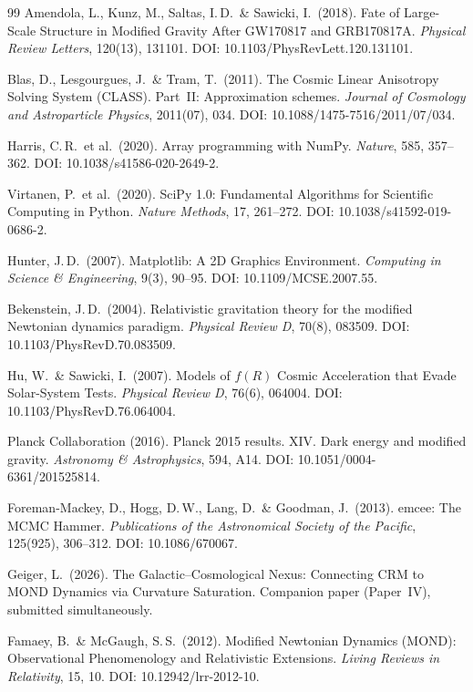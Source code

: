 \documentclass[aps,prd,twocolumn,superscriptaddress,nofootinbib]{revtex4-2}
\begin{document}
\begin{thebibliography}{99}
Amendola, L., Kunz, M., Saltas, I.\,D.\ \& Sawicki, I.\ (2018).
Fate of Large-Scale Structure in Modified Gravity After GW170817 and GRB170817A.
\textit{Physical Review Letters}, 120(13), 131101.
DOI: 10.1103/PhysRevLett.120.131101.

Blas, D., Lesgourgues, J.\ \& Tram, T.\ (2011).
The Cosmic Linear Anisotropy Solving System (CLASS). Part~II: Approximation schemes.
\textit{Journal of Cosmology and Astroparticle Physics}, 2011(07), 034.
DOI: 10.1088/1475-7516/2011/07/034.

Harris, C.\,R.\ et al.\ (2020).
Array programming with NumPy.
\textit{Nature}, 585, 357--362.
DOI: 10.1038/s41586-020-2649-2.

Virtanen, P.\ et al.\ (2020).
SciPy 1.0: Fundamental Algorithms for Scientific Computing in Python.
\textit{Nature Methods}, 17, 261--272.
DOI: 10.1038/s41592-019-0686-2.

Hunter, J.\,D.\ (2007).
Matplotlib: A 2D Graphics Environment.
\textit{Computing in Science \& Engineering}, 9(3), 90--95.
DOI: 10.1109/MCSE.2007.55.

Bekenstein, J.\,D.\ (2004).
Relativistic gravitation theory for the modified Newtonian dynamics paradigm.
\textit{Physical Review D}, 70(8), 083509.
DOI: 10.1103/PhysRevD.70.083509.

Hu, W.\ \& Sawicki, I.\ (2007).
Models of $f(R)$ Cosmic Acceleration that Evade Solar-System Tests.
\textit{Physical Review D}, 76(6), 064004.
DOI: 10.1103/PhysRevD.76.064004.

Planck Collaboration (2016).
Planck 2015 results. XIV. Dark energy and modified gravity.
\textit{Astronomy \& Astrophysics}, 594, A14.
DOI: 10.1051/0004-6361/201525814.

Foreman-Mackey, D., Hogg, D.\,W., Lang, D.\ \& Goodman, J.\ (2013).
emcee: The MCMC Hammer.
\textit{Publications of the Astronomical Society of the Pacific}, 125(925), 306--312.
DOI: 10.1086/670067.

Geiger, L.\ (2026).
The Galactic--Cosmological Nexus: Connecting CRM to MOND Dynamics via Curvature Saturation.
Companion paper (Paper~IV), submitted simultaneously.

Famaey, B.\ \& McGaugh, S.\,S.\ (2012).
Modified Newtonian Dynamics (MOND): Observational Phenomenology and Relativistic Extensions.
\textit{Living Reviews in Relativity}, 15, 10.
DOI: 10.12942/lrr-2012-10.

\end{thebibliography}
\end{document}
